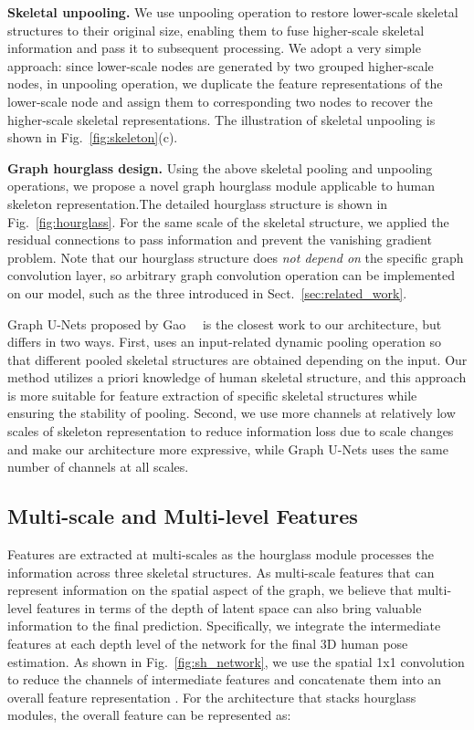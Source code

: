 \documentclass[final]{cvpr}
\begin{document}
\textbf{Skeletal unpooling.}
We use unpooling operation to restore lower-scale skeletal structures to their original size, enabling them to fuse higher-scale skeletal information and pass it to subsequent processing.
We adopt a very simple approach: since lower-scale nodes are generated by two grouped higher-scale nodes, in unpooling operation, we duplicate the feature representations of the lower-scale node and assign them to corresponding two nodes to recover the higher-scale skeletal representations.
The illustration of skeletal unpooling is shown in Fig.~\ref{fig:skeleton}(c).

\textbf{Graph hourglass design.}
Using the above skeletal pooling and unpooling operations, we propose a novel graph hourglass module applicable to human skeleton representation.The detailed hourglass structure is shown in Fig.~\ref{fig:hourglass}.
For the same scale of the skeletal structure, we applied the residual connections \cite{He2016DeepRL} to pass information and prevent the vanishing gradient problem.
Note that our hourglass structure does \textit{not depend on} the specific graph convolution layer, so arbitrary graph convolution operation can be implemented on our model, such as the three introduced in Sect.~\ref{sec:related_work}.

Graph U-Nets proposed by Gao~\etal~\cite{gao2019graph} is the closest work to our architecture, but differs in two ways.
First, \cite{gao2019graph} uses an input-related dynamic pooling operation so that different pooled skeletal structures are obtained depending on the input.
Our method utilizes a priori knowledge of human skeletal structure, and this approach is more suitable for feature extraction of specific skeletal structures while ensuring the stability of pooling.
Second, we use more channels at relatively low scales of skeleton representation to reduce information loss due to scale changes and make our architecture more expressive, while Graph U-Nets uses the same number of channels at all scales.

\subsection{Multi-scale and Multi-level Features}\label{sec:msml}
Features are extracted at multi-scales as the hourglass module processes the information across three skeletal structures.
As multi-scale features that can represent information on the spatial aspect of the graph, we believe that multi-level features in terms of the depth of latent space can also bring valuable information to the final prediction.
Specifically, we integrate the intermediate features at each depth level of the network for the final 3D human pose estimation.
As shown in Fig.~\ref{fig:sh_network}, we use the spatial 1x1 convolution to reduce the channels of intermediate features and concatenate them into an overall feature representation .
For the architecture that stacks  hourglass modules, the overall feature can be represented as:
\end{document}
